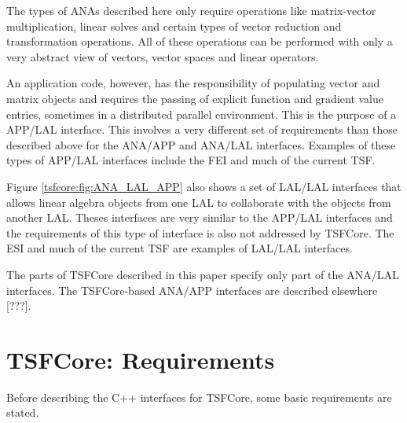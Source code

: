 \documentclass[10pt,fleqn]{article}
\begin{document}
The types of ANAs described here only require operations like
matrix-vector multiplication, linear solves and certain types of
vector reduction and transformation operations.  All of these
operations can be performed with only a very abstract view of vectors,
vector spaces and linear operators.

An application code, however, has the responsibility of populating
vector and matrix objects and requires the passing of explicit
function and gradient value entries, sometimes in a distributed
parallel environment.  This is the purpose of a APP/LAL interface.
This involves a very different set of requirements than those
described above for the ANA/APP and ANA/LAL interfaces.  Examples of
these types of APP/LAL interfaces include the FEI \cite{ref:fei} and
much of the current TSF.

Figure \ref{tsfcore:fig:ANA_LAL_APP} also shows a set of LAL/LAL
interfaces that allows linear algebra objects from one LAL to
collaborate with the objects from another LAL.  Theses interfaces are
very similar to the APP/LAL interfaces and the requirements of this
type of interface is also not addressed by TSFCore.  The ESI
\cite{ref:esi_2001} and much of the current TSF are examples of
LAL/LAL interfaces.

The parts of TSFCore described in this paper specify only part of the
ANA/LAL interfaces.  The TSFCore-based ANA/APP interfaces are 
described elsewhere [???].

%
\section{TSFCore: Requirements}
\label{tsfcore:sec:TSFCore_requirements}
%

Before describing the C++ interfaces for TSFCore, some basic
requirements are stated.
\end{document}
